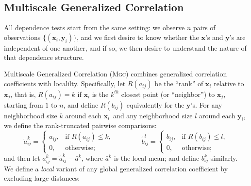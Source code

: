 \documentclass[11pt]{article}
\providecommand{\sct}[1]{{\normalfont\textsc{#1}}}
\providecommand{\mt}[1]{\widetilde{#1}}
\providecommand{\mb}[1]{\boldsymbol{#1}}
\newcommand{\Mgc}{\sct{Mgc}}
\newcommand{\mbx}{\ensuremath{\mb{x}}}
\newcommand{\mby}{\ensuremath{\mb{y}}}
\begin{document}


\subsection*{Multiscale Generalized Correlation}
\label{s:mgc}

All dependence tests start from the same setting: we observe $n$ pairs of observations $\{(\mbx_i,\mby_i)\}$, and we first desire to know whether the \mbx's and \mby's are independent of one another, and if so, we then desire to understand the nature of that dependence structure.


Multiscale Generalized Correlation (\Mgc) combines generalized correlation coefficients with localilty.
Specifically, let $R(a_{ij})$  be the ``rank'' of $\mbx_i$ relative to $\mbx_j$, that is, $R(a_{ij})=k$ if $\mbx_i$ is the $k^{th}$ closest point (or ``neighbor'') to $\mbx_j$, starting from $1$ to $n$, and  define $R(b_{ij})$ equivalently for the \mby's. For any neighborhood size $k$ around each $\mbx_i$~and any neighborhood size $l$ around each $\mby_i$, we define the rank-truncated pairwise comparisons:
\begin{equation}
\label{localCoef2}
    \mt{a}_{ij}^k=
    \begin{cases}
      a_{ij}, & \text{if } R(a_{ij}) \leq k, \\
      0, & \text{otherwise};
    \end{cases} \qquad \qquad
    \mt{b}_{ij}^l=
    \begin{cases}
      b_{ij}, & \text{if } R(b_{ij}) \leq l, \\
      0, & \text{otherwise};
    \end{cases}
\end{equation}
and then let $a^k_{ij}=\mt{a}^k_{ij} - \bar{a}^k$, 
where $\bar{a}^k$ is the local mean;
and define $b^k_{ij}$ similarly.
We define a \emph{local} variant of any global generalized correlation coefficient by  excluding large distances: %
\end{document}
